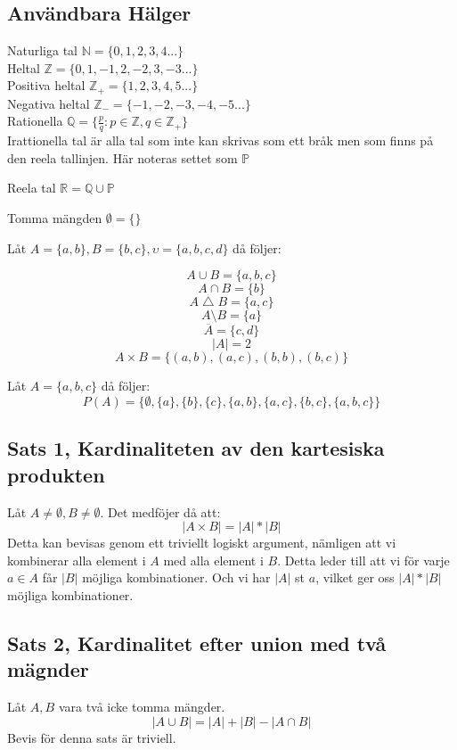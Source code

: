 \documentclass{article}
\begin{document}
	\subsection{Användbara Hälger}
	Naturliga tal $\mathbb{N} = \{0, 1, 2, 3, 4...\}$\\
	Heltal $\mathbb{Z} = \{0, 1, -1, 2, -2, 3, -3...\}$\\
	Positiva heltal $\mathbb{Z}_{+} = \{1, 2, 3, 4, 5...\}$\\
	Negativa heltal $\mathbb{Z}_{-} = \{-1, -2, -3, -4, -5...\}$\\
	Rationella $\mathbb{Q} = \{\frac{p}{q} : p \in \mathbb{Z}, q \in \mathbb{Z}_{+}\}$\\

	Irattionella tal är alla tal som inte kan skrivas som ett bråk men som finns på den reela tallinjen. Här noteras settet som $\mathbb{P}$

	Reela tal \( \mathbb{R} = \mathbb{Q} \cup \mathbb{P} \)

	Tomma mängden $\emptyset = \{\}$

	Låt $A = \{a, b\}, B = \{b, c\}, \upsilon = \{a, b, c, d\}$ då följer:

	$$ A \cup B = \{a, b, c\} $$
	$$ A \cap B = \{b\} $$
	$$ A \bigtriangleup B = \{a, c\} $$
	$$ A \setminus B = \{a\} $$
	$$ \overline{A} = \{c, d\} $$
	$$ |A| = 2 $$
	$$ A \times B = \{(a, b), (a, c), (b, b), (b, c)\}$$

	Låt $A = \{a, b, c\}$ då följer: 
	$$ P(A) = \{\emptyset, \{a\}, \{b\}, \{c\}, \{a, b\}, \{a, c\}, \{b, c\}, \{a, b, c\}\} $$

	\subsection{Sats 1, Kardinaliteten av den kartesiska produkten}
	Låt $A \not= \emptyset, B \not= \emptyset$. Det medföjer då att:
	$$ |A \times B| = |A| * |B| $$ 
	Detta kan bevisas genom ett triviellt logiskt argument, nämligen att vi kombinerar alla element i $A$ med alla element i $B$. 
	Detta leder till att vi för varje $a \in A$ får $|B|$ möjliga kombinationer. Och vi har $|A|$ st $a$, vilket ger oss $ |A| * |B| $ möjliga kombinationer. 
	
	\subsection{Sats 2, Kardinalitet efter union med två mägnder}
	Låt $A, B$ vara två icke tomma mängder.
	$$ |A \cup B| = |A| + |B| - |A \cap B| $$
	Bevis för denna sats är triviell.
	
\end{document}
